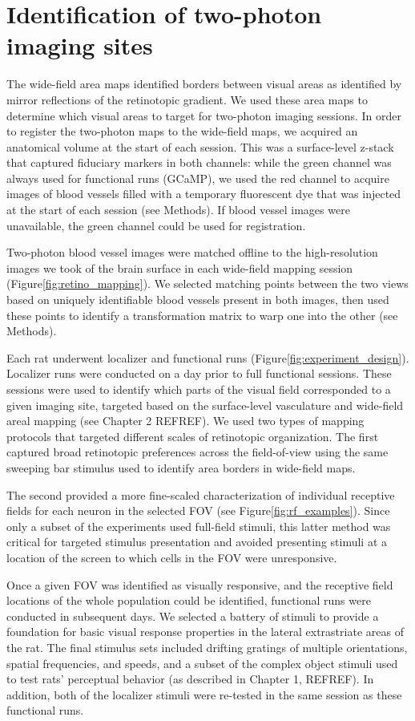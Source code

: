 \section{Identification of two-photon imaging sites}
The wide-field area maps identified borders between visual areas as identified by mirror reflections of the retinotopic gradient. We used these area maps to determine which visual areas to target for two-photon imaging sessions. In order to register the two-photon maps to the wide-field maps, we acquired an anatomical volume at the start of each session. This was a surface-level z-stack that captured fiduciary markers in both channels: while the green channel was always used for functional runs (GCaMP), we used the red channel to acquire images of blood vessels filled with a temporary fluorescent dye that was injected at the start of each session (see Methods). If blood vessel images were unavailable, the green channel could be used for registration. 

Two-photon blood vessel images were matched offline to the high-resolution images we took of the brain surface in each wide-field mapping session (Figure\ref{fig:retino_mapping}). We selected matching points between the two views based on uniquely identifiable blood vessels present in both images, then used these points to identify a transformation matrix to warp one into the other (see Methods).

Each rat underwent localizer and functional runs (Figure\ref{fig:experiment_design}). Localizer runs were conducted on a day prior to full functional sessions. These sessions were used to identify which parts of the visual field corresponded to a given imaging site, targeted based on the surface-level vasculature and wide-field areal mapping (see Chapter 2 REFREF). We used two types of mapping protocols that targeted different scales of retinotopic organization. The first captured broad retinotopic preferences across the field-of-view using the same sweeping bar stimulus used to identify area borders in wide-field maps. 

The second provided a more fine-scaled characterization of individual receptive fields for each neuron in the selected FOV (see Figure\ref{fig:rf_examples}). Since only a subset of the experiments used full-field stimuli, this latter method was critical for targeted stimulus presentation and avoided presenting stimuli at a location of the screen to which cells in the FOV were unresponsive. 

Once a given FOV was identified as visually responsive, and the receptive field locations of the whole population could be identified, functional runs were conducted in subsequent days. We selected a battery of stimuli to provide a foundation for basic visual response properties in the lateral extrastriate areas of the rat. The final stimulus sets included drifting gratings of multiple orientations, spatial frequencies, and speeds, and a subset of the complex object stimuli used to test rats' perceptual behavior (as described in Chapter 1, REFREF). In addition, both of the localizer stimuli were re-tested in the same session as these functional runs.



